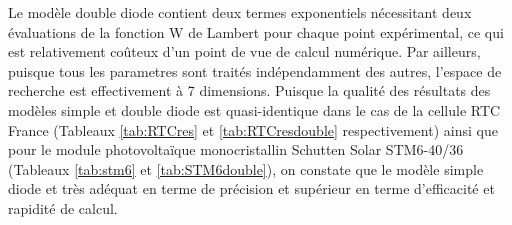 Le modèle double diode contient deux termes exponentiels nécessitant deux évaluations de la fonction W de Lambert pour chaque point expérimental, ce qui est relativement coûteux d'un point de vue de calcul numérique. Par ailleurs, puisque tous les parametres sont traités indépendamment des autres, l'espace de recherche est effectivement à 7 dimensions. Puisque la qualité des résultats des modèles simple et double diode est quasi-identique dans le cas de la cellule RTC France (Tableaux \ref{tab:RTCres} et \ref{tab:RTCresdouble} respectivement) ainsi que pour le module photovoltaïque monocristallin Schutten Solar STM6-40/36 (Tableaux \ref{tab:stm6} et \ref{tab:STM6double}), on constate que le modèle simple diode et très adéquat en terme de précision et supérieur en terme d'efficacité et rapidité de calcul.

